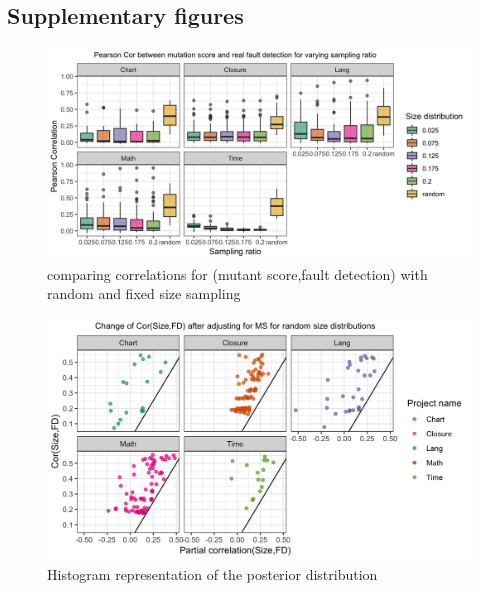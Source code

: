 \documentclass[10pt,letterpaper]{article}
\begin{document}
\subsection*{Supplementary figures}


  \begin{figure}[ht!]
        \centering
        \includegraphics[scale=0.15]{figures/reproduce_fig_3_stratify_size.png}
        \caption{comparing correlations for (mutant score,fault detection) with random and fixed size sampling}
    \end{figure}




  \begin{figure}[ht!]
        \centering
        \includegraphics[scale=0.15]{figures/partial_cor_SIZE_fault_scatter.png}
        \caption{Histogram representation of the posterior distribution}
        \label{fig:par_cor_size_scatter}
    \end{figure}
\end{document}
